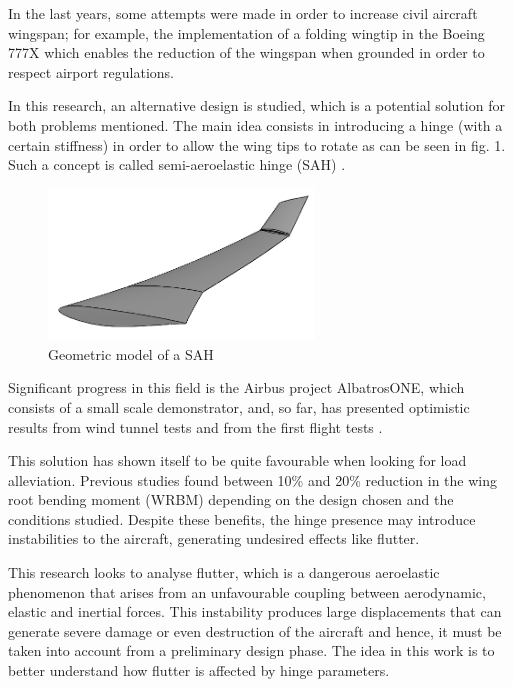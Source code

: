 \documentclass[conference]{IEEEtran}
\newlength\figureheight
\newlength\figurewidth
\begin{document}
In the last years, some attempts were made in order to increase civil aircraft wingspan; for example, the implementation of a folding wingtip in the Boeing 777X which enables the reduction of the wingspan when grounded in order to respect airport regulations.

In this research, an alternative design is studied, which is a potential solution for both problems mentioned. The main idea consists in introducing a hinge (with a certain stiffness) in order to allow the wing tips to rotate as can be seen in fig. 1. Such a concept is called semi-aeroelastic hinge (SAH) \cite{Castrichini2016,Castrichini2020}. 

\begin{figure}[htp]
  \centering
  \setlength\figureheight{5cm}
  \setlength\figurewidth{6cm}
  \includegraphics[width=200pt]{images/HingedWing.png}
  \caption{Geometric model of a SAH}
  \label{fig:my-figure}
\end{figure}

Significant progress in this field is the Airbus project AlbatrosONE, which consists of a small scale demonstrator, and, so far, has presented optimistic results from wind tunnel tests and from the first flight tests \cite{wilson2019small}.

This solution has shown itself to be quite favourable when looking for load alleviation. Previous studies found between 10\% and 20\% reduction in the wing root bending moment (WRBM) depending on the design chosen and the conditions studied. Despite these benefits, the hinge presence may introduce instabilities to the aircraft, generating undesired effects like flutter.

This research looks to analyse flutter, which is a dangerous aeroelastic phenomenon that arises from an unfavourable coupling between aerodynamic, elastic and inertial forces. This instability produces large displacements that can generate severe damage or even destruction of the aircraft and hence, it must be taken into account from a preliminary design phase. The idea in this work is to better understand how flutter is affected by hinge parameters.
\end{document}
